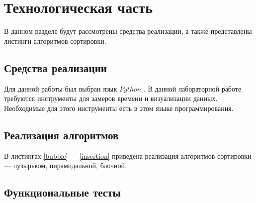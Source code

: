\chapter{Технологическая часть}
В данном разделе будут рассмотрены средства реализации, а также представлены листинги алгоритмов сортировки.
\section{Средства реализации}
Для данной работы был выбран язык $Python$ \cite{python}. В данной лабораторной работе требуются инструменты для замеров времени и визуализации данных. Необходимые для этого инструменты есть в этом языке программирования.


\section{Реализация алгоритмов}

В листингах \ref{bubble} --- \ref{insertion} приведена реализация алгоритмов сортировки --- пузырьком, пирамидальной, блочной.


\pagebreak












\clearpage
\section{Функциональные тесты}

